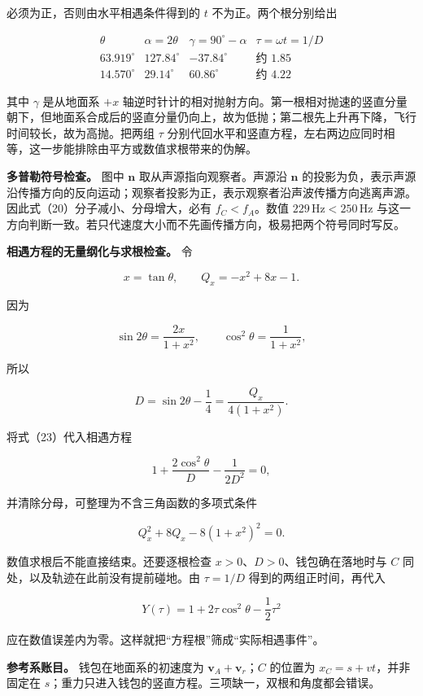 \documentclass[12pt,a4paper,UTF8]{ctexart}
\begin{document}
必须为正，否则由水平相遇条件得到的 \(t\) 不为正。两个根分别给出

\[
\begin{array}{c|c|c|c}
\theta & \alpha=2\theta & \gamma=90^\circ-\alpha & \tau=\omega t=1/D\\ \hline
63.919^\circ &127.84^\circ&-37.84^\circ&\text{约 }1.85\\
14.570^\circ &29.14^\circ&60.86^\circ&\text{约 }4.22
\end{array} \tag{22}
\]

其中 \(\gamma\) 是从地面系 \(+x\)
轴逆时针计的相对抛射方向。第一根相对抛速的竖直分量朝下，但地面系合成后的竖直分量仍向上，故为低抛；第二根先上升再下降，飞行时间较长，故为高抛。把两组
\(\tau\)
分别代回水平和竖直方程，左右两边应同时相等，这一步能排除由平方或数值求根带来的伪解。

\textbf{多普勒符号检查。} 图中 \(\bm n\) 取从声源指向观察者。声源沿
\(\bm n\)
的投影为负，表示声源沿传播方向的反向运动；观察者投影为正，表示观察者沿声波传播方向逃离声源。因此式（20）分子减小、分母增大，必有
\(f_C<f_A\)。数值 \(229\,\mathrm{Hz}<250\,\mathrm{Hz}\)
与这一方向判断一致。若只代速度大小而不先画传播方向，极易把两个符号同时写反。

\textbf{相遇方程的无量纲化与求根检查。} 令

\[
x=\tan\theta,
\qquad
Q_x=-x^2+8x-1.
\]

因为

\[
\sin2\theta=\frac{2x}{1+x^2},
\qquad
\cos^2\theta=\frac1{1+x^2},
\]

所以

\[
D=\sin2\theta-\frac14
=\frac{Q_x}{4(1+x^2)}. \tag{23}
\]

将式（23）代入相遇方程

\[
1+\frac{2\cos^2\theta}{D}-\frac1{2D^2}=0,
\]

并清除分母，可整理为不含三角函数的多项式条件

\[
Q_x^2+8Q_x-8(1+x^2)^2=0. \tag{24}
\]

数值求根后不能直接结束。还要逐根检查 \(x>0\)、\(D>0\)、钱包确在落地时与
\(C\) 同处，以及轨迹在此前没有提前碰地。由 \(\tau=1/D\)
得到的两组正时间，再代入

\[
Y(\tau)=1+2\tau\cos^2\theta-\frac12\tau^2
\]

应在数值误差内为零。这样就把``方程根''筛成``实际相遇事件''。

\textbf{参考系账目。} 钱包在地面系的初速度为 \(\bm v_A+\bm v_r\)；\(C\)
的位置为 \(x_C=s+vt\)，并非固定在
\(s\)；重力只进入钱包的竖直方程。三项缺一，双根和角度都会错误。
\end{document}
